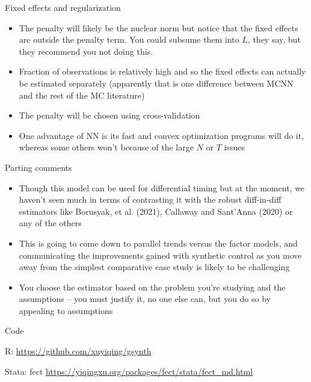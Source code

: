 \documentclass{beamer}
\begin{document}
\begin{frame}{Fixed effects and regularization}

\begin{itemize}
\item The penalty will likely be the nuclear norm but notice that the fixed effects are outside the penalty term.  You could subsume them into $L$, they say, but they recommend you not doing this.
\item Fraction of observations is relatively high and so the fixed effects can actually be estimated separately (apparently that is one difference between MCNN and the rest of the MC literature)
\item The penalty will be chosen using cross-validation
\item One advantage of NN is its fast and convex optimization programs will do it, whereas some others won't because of the large $N$ or $T$ issues
\end{itemize}

\end{frame}


\begin{frame}{Parting comments}

\begin{itemize}
\item Though this model  can be used for differential timing but at the moment, we haven't seen much in terms of contrasting it with the robust diff-in-diff estimators like Borusyak, et al. (2021), Callaway and Sant'Anna (2020) or any of the others
\item This is going to come down to parallel trends versus the factor models, and communicating the improvements gained with synthetic control as you move away from the simplest comparative case study is likely to be challenging
\item You choose the estimator based on the problem you're studying and the assumptions -- you must justify it, no one else can, but you do so by appealing to assumptions
\end{itemize}

\end{frame}

\begin{frame}{Code}

R: \url{https://github.com/xuyiqing/gsynth}

\bigskip

Stata: fect \url{https://yiqingxu.org/packages/fect/stata/fect_md.html}

\end{frame}
\end{document}
